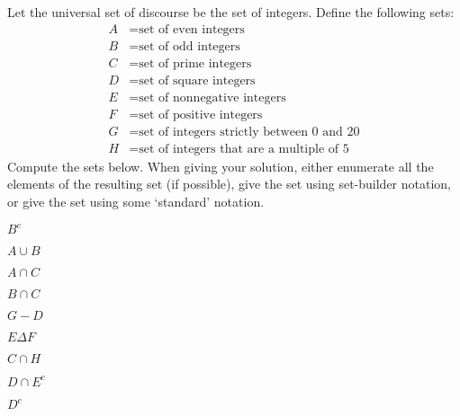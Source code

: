 \documentclass[11pt,letterpaper]{article}
\begin{document}
\newpage



 Let the universal set of discourse be the set of integers. Define the following sets:
	\[
	\begin{aligned}
	A&= \text{set of even integers} \\
	B&= \text{set of odd integers} \\
	C&= \text{set of prime integers} \\
	D&= \text{set of square integers} \\
	E&= \text{set of nonnegative integers} \\
	F&= \text{set of positive integers} \\
	G&= \text{set of integers strictly between 0 and 20} \\
	H&= \text{set of integers that are a multiple of 5}
	\end{aligned}
	\]
Compute the sets below. When giving your solution, either enumerate all the elements of the resulting set (if possible), give the set using set-builder notation, or give the set using some `standard' notation. 
	\begin{2enumerate}
	\item $B^c$
	\item $A \cup B$
	\item $A \cap C$
	\item $B \cap C$
	\item $G - D$	
	\item $E \Delta F$
	\item $C \cap H$
	\item $D \cap E^c$
	\item $D^c$
	\end{2enumerate} 
\end{document}
